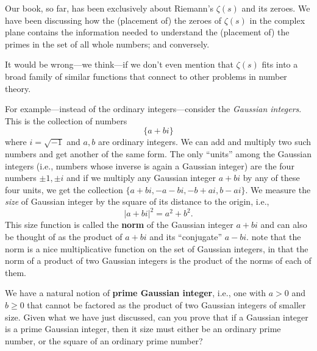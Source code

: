 \documentclass[openany]{book}
\theoremstyle{plain}
\theoremstyle{definition}
\begin{document}
{{{Our book, so far, has been exclusively about Riemann's $\zeta(s)$ and
its zeroes. We have been discussing how the (placement of) the zeroes
of $\zeta(s)$ in the complex plane contains the information needed to
understand the (placement of) the primes in the set of all whole
numbers; and conversely.

It would be wrong---we think---if we don't even mention that
$\zeta(s)$ fits into a broad family of similar functions that connect to other problems in number theory.



For example---instead of the ordinary integers---consider the {\it
  Gaussian integers}. This is the collection of numbers
 $$ \{ a+bi\}$$
 where $i = {\sqrt{-1}}$ and $a,b$ are ordinary integers. We can add
 and multiply two such numbers and get another of the same form. The
 only ``units'' among the Gaussian integers (i.e., numbers whose
 inverse is again a Gaussian integer) are the four numbers $\pm 1, \pm
 i$ and if we multiply any Gaussian integer $a+bi$ by any of these
 four units, we get the collection $\{a+bi, -a-bi, -b+ai, b -ai\}$.
 We measure the {\it size} of Gaussian integer by the square of its
 distance to the origin, i.e., $$|a+bi|^2 = {a^2+b^2}.$$   This size function  is called the {\bf norm} of the Gaussian integer $a+bi$ and can also be thought of as  the product of $a+bi$ and its ``conjugate'' $a-bi$.   note that
 the norm is a nice multiplicative function on the set of Gaussian
 integers, in that the norm of a product of two Gaussian integers is
 the product of the norms of each of them.

 We have a natural notion of {\bf prime Gaussian integer}, i.e., one
 with $a>0$ and $b\geq 0$ that cannot be factored as the product of
 two Gaussian integers of smaller size.  Given what we have just
 discussed, can you prove that if a Gaussian integer is a prime
 Gaussian integer, then it size must either be an ordinary prime
 number, or the square of an ordinary prime number?

}}}
\end{document}
